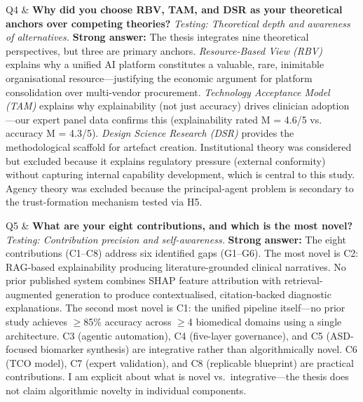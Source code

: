 \begin{xltabular}
Q4 & \textbf{Why did you choose RBV, TAM, and DSR as your theoretical anchors over competing theories?} \newline
\textit{Testing: Theoretical depth and awareness of alternatives.} \newline\newline
\textbf{Strong answer:} The thesis integrates nine theoretical perspectives, but three are primary anchors. \textit{Resource-Based View (RBV)} explains why a unified AI platform constitutes a valuable, rare, inimitable organisational resource---justifying the economic argument for platform consolidation over multi-vendor procurement. \textit{Technology Acceptance Model (TAM)} explains why explainability (not just accuracy) drives clinician adoption---our expert panel data confirms this (explainability rated M = 4.6/5 vs. accuracy M = 4.3/5). \textit{Design Science Research (DSR)} provides the methodological scaffold for artefact creation. Institutional theory was considered but excluded because it explains regulatory pressure (external conformity) without capturing internal capability development, which is central to this study. Agency theory was excluded because the principal-agent problem is secondary to the trust-formation mechanism tested via H5. \\
\addlinespace

Q5 & \textbf{What are your eight contributions, and which is the most novel?} \newline
\textit{Testing: Contribution precision and self-awareness.} \newline\newline
\textbf{Strong answer:} The eight contributions (C1--C8) address six identified gaps (G1--G6). The most novel is C2: RAG-based explainability producing literature-grounded clinical narratives. No prior published system combines SHAP feature attribution with retrieval-augmented generation to produce contextualised, citation-backed diagnostic explanations. The second most novel is C1: the unified pipeline itself---no prior study achieves $\geq$85\% accuracy across $\geq$4 biomedical domains using a single architecture. C3 (agentic automation), C4 (five-layer governance), and C5 (ASD-focused biomarker synthesis) are integrative rather than algorithmically novel. C6 (TCO model), C7 (expert validation), and C8 (replicable blueprint) are practical contributions. I am explicit about what is novel vs.\ integrative---the thesis does not claim algorithmic novelty in individual components. \\

\end{xltabular}

